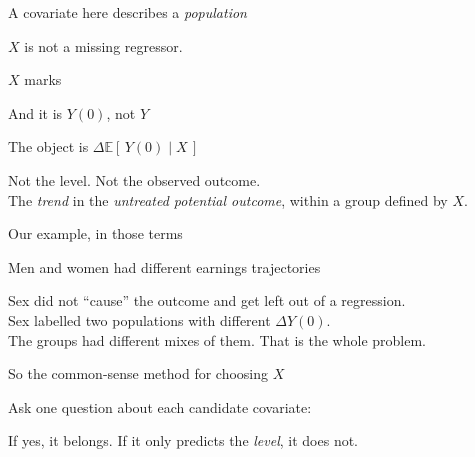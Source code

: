 \documentclass[aspectratio=169,11pt]{beamer}
\begin{document}
\begin{frame}{A covariate here describes a \textit{population}}
\vspace{1.2em}
\begin{center}
\Large
$X$ is not a missing regressor.
\end{center}
\vspace{1em}
\begin{center}
\Large
$X$ marks  \\[0.3em] 
\end{center}
\end{frame}

\begin{frame}{And it is $Y(0)$, not $Y$}
\vspace{1.4em}
\begin{center}
\Large
The object is \;$\Delta \mathbb{E}[\,Y(0) \mid X\,]$
\end{center}
\vspace{1.2em}
\begin{center}\color{warmgray}
Not the level. \;Not the observed outcome. \;\\ The \textit{trend} in the \textit{untreated potential outcome}, within a group defined by $X$.
\end{center}
\end{frame}

\begin{frame}{Our example, in those terms}
\vspace{1em}
\begin{center}
Men and women had different earnings trajectories \\ 
\end{center}
\vspace{1em}
\begin{center}\color{warmgray}
Sex did not ``cause'' the outcome and get left out of a regression. \\[0.4em]
Sex labelled two populations with different $\Delta Y(0)$. \\[0.4em]
The groups had different mixes of them. \;That is the whole problem.
\end{center}
\end{frame}

\begin{frame}{So the common-sense method for choosing $X$}
\vspace{1em}
\begin{center}
Ask one question about each candidate covariate:
\end{center}
\vspace{1em}
\begin{center}
\Large{}
\end{center}
\vspace{1.2em}
\begin{center}\color{warmgray}
If yes, it belongs. \;If it only predicts the \textit{level}, it does not.
\end{center}
\end{frame}
\end{document}
